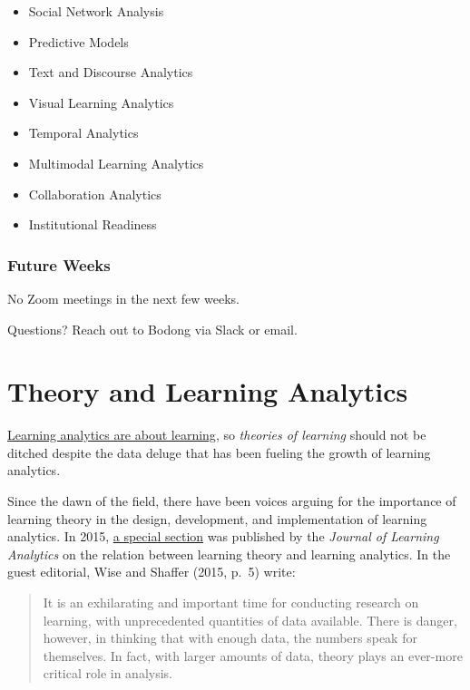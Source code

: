 \documentclass[
]{book}
\providecommand{\tightlist}{%
  \setlength{\itemsep}{0pt}\setlength{\parskip}{0pt}}
\begin{document}
\begin{itemize}
\tightlist
\item
  Social Network Analysis
\item
  Predictive Models
\item
  Text and Discourse Analytics
\item
  Visual Learning Analytics
\item
  Temporal Analytics
\item
  Multimodal Learning Analytics
\item
  Collaboration Analytics
\item
  Institutional Readiness
\end{itemize}

\hypertarget{future-weeks}{%
\subsection{Future Weeks}\label{future-weeks}}

No Zoom meetings in the next few weeks.

Questions? Reach out to Bodong via Slack or email.

\hypertarget{theory-and-learning-analytics}{%
\chapter{Theory and Learning Analytics}\label{theory-and-learning-analytics}}

\href{https://link.springer.com/article/10.1007\%2Fs11528-014-0822-x}{Learning analytics are about learning}, so \emph{theories of learning} should not be ditched despite the data deluge that has been fueling the growth of learning analytics.

Since the dawn of the field, there have been voices arguing for the importance of learning theory in the design, development, and implementation of learning analytics. In 2015, \href{https://learning-analytics.info/journals/index.php/JLA/issue/view/358}{a special section} was published by the \emph{Journal of Learning Analytics} on the relation between learning theory and learning analytics. In the guest editorial, Wise and Shaffer (2015, p.~5) write:

\begin{quote}
It is an exhilarating and important time for conducting research on learning, with unprecedented quantities of data available. There is danger, however, in thinking that with enough data, the numbers speak for themselves. In fact, with larger amounts of data, theory plays an ever-more critical role in analysis.
\end{quote}
\end{document}
